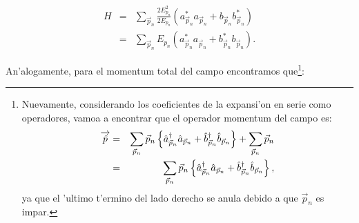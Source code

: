 \begin{eqnarray*}
H &=&\sum_{\vec{p}_{n}}\frac{2E_{p_{n}}^{2}}{2E_{p_{n}}}\left( a_{\vec{p}%
_{n}}^{\ast }a_{\vec{p}_{n}}+b_{\vec{p}_{n}}b_{\vec{p}_{n}}^{\ast }\right) 
\\
&=&\sum_{\vec{p}_{n}}E_{p_{n}}\left( a_{\vec{p}_{n}}^{\ast }a_{\vec{p}%
_{n}}+b_{\vec{p}_{n}}^{\ast }b_{\vec{p}_{n}}\right) .
\end{eqnarray*}

An'alogamente, para el momentum total del campo encontramos que\footnote{%
Nuevamente, considerando los coeficientes de la expansi'on en serie como
operadores, vamoa a encontrar que el operador momentum del campo es:%
\begin{eqnarray*}
\overrightarrow{\hat{p}} &=&\sum_{\vec{p}_{n}}\vec{p}_{n}\left\{ \hat{a}_{%
\vec{p}_{n}}^{\dagger }\hat{a}_{\vec{p}_{n}}+\hat{b}_{\vec{p}_{n}}^{\dagger }%
\hat{b}_{\vec{p}_{n}}\right\} +\sum_{\vec{p}_{n}}\vec{p}_{n} \\
&=&\sum_{\vec{p}_{n}}\vec{p}_{n}\left\{ \hat{a}_{\vec{p}_{n}}^{\dagger }\hat{%
a}_{\vec{p}_{n}}+\hat{b}_{\vec{p}_{n}}^{\dagger }\hat{b}_{\vec{p}%
_{n}}\right\} ,
\end{eqnarray*}%
ya que el 'ultimo t'ermino del lado derecho se anula debido a que $%
\vec{p}_{n}$ es impar.}:%
